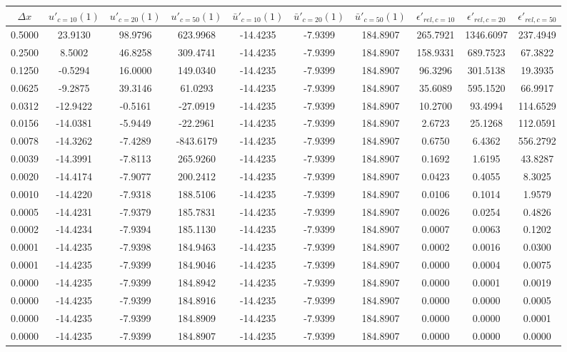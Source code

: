 \begin{tabular}{|c|c|c|c|c|c|c|c|c|c|}
\hline
\textbf{$\Delta x$}&\textbf{$u'_{c=10}(1)$}&\textbf{$u'_{c=20}(1)$}&\textbf{$u'_{c=50}(1)$}&\textbf{$\bar{u}'_{c=10}(1)$}&\textbf{$\bar{u}'_{c=20}(1)$}&\textbf{$\bar{u}'_{c=50}(1)$}&\textbf{$\epsilon'_{rel,c=10}$}&\textbf{$\epsilon'_{rel,c=20}$}&\textbf{$\epsilon'_{rel,c=50}$}\\\hline
0.5000&23.9130&98.9796&623.9968&-14.4235&-7.9399&184.8907&265.7921&1346.6097&237.4949\\\hline
0.2500&8.5002&46.8258&309.4741&-14.4235&-7.9399&184.8907&158.9331&689.7523&67.3822\\\hline
0.1250&-0.5294&16.0000&149.0340&-14.4235&-7.9399&184.8907&96.3296&301.5138&19.3935\\\hline
0.0625&-9.2875&39.3146&61.0293&-14.4235&-7.9399&184.8907&35.6089&595.1520&66.9917\\\hline
0.0312&-12.9422&-0.5161&-27.0919&-14.4235&-7.9399&184.8907&10.2700&93.4994&114.6529\\\hline
0.0156&-14.0381&-5.9449&-22.2961&-14.4235&-7.9399&184.8907&2.6723&25.1268&112.0591\\\hline
0.0078&-14.3262&-7.4289&-843.6179&-14.4235&-7.9399&184.8907&0.6750&6.4362&556.2792\\\hline
0.0039&-14.3991&-7.8113&265.9260&-14.4235&-7.9399&184.8907&0.1692&1.6195&43.8287\\\hline
0.0020&-14.4174&-7.9077&200.2412&-14.4235&-7.9399&184.8907&0.0423&0.4055&8.3025\\\hline
0.0010&-14.4220&-7.9318&188.5106&-14.4235&-7.9399&184.8907&0.0106&0.1014&1.9579\\\hline
0.0005&-14.4231&-7.9379&185.7831&-14.4235&-7.9399&184.8907&0.0026&0.0254&0.4826\\\hline
0.0002&-14.4234&-7.9394&185.1130&-14.4235&-7.9399&184.8907&0.0007&0.0063&0.1202\\\hline
0.0001&-14.4235&-7.9398&184.9463&-14.4235&-7.9399&184.8907&0.0002&0.0016&0.0300\\\hline
0.0001&-14.4235&-7.9399&184.9046&-14.4235&-7.9399&184.8907&0.0000&0.0004&0.0075\\\hline
0.0000&-14.4235&-7.9399&184.8942&-14.4235&-7.9399&184.8907&0.0000&0.0001&0.0019\\\hline
0.0000&-14.4235&-7.9399&184.8916&-14.4235&-7.9399&184.8907&0.0000&0.0000&0.0005\\\hline
0.0000&-14.4235&-7.9399&184.8909&-14.4235&-7.9399&184.8907&0.0000&0.0000&0.0001\\\hline
0.0000&-14.4235&-7.9399&184.8907&-14.4235&-7.9399&184.8907&0.0000&0.0000&0.0000\\\hline
\end{tabular}
